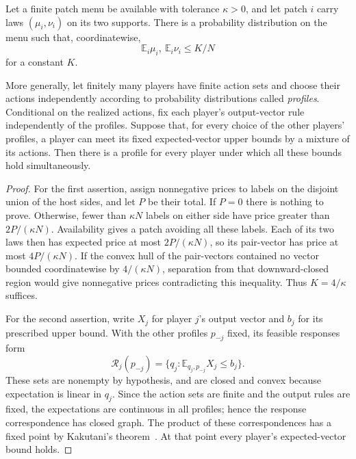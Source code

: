 \begin{lemma}\label{lem:balanced-profiles}
Let a finite patch menu be available with tolerance \(\kappa>0\), and let
patch \(i\) carry laws \((\mu_i,\nu_i)\) on its two supports. There is a
probability distribution on the menu such that, coordinatewise,
\[
 \mathbb E_i\mu_i,\ \mathbb E_i\nu_i\le K/N
\]
for a constant \(K\).

More generally, let finitely many players have finite action sets and
choose their actions independently according to probability distributions
called \emph{profiles}. Conditional on the realized actions, fix each
player's output-vector rule independently of the profiles. Suppose that,
for every choice of the other players' profiles, a player can meet its
fixed expected-vector upper bounds by a mixture of its actions. Then
there is a profile for every player under which all these bounds hold
simultaneously.
\end{lemma}

\begin{proof}
For the first assertion, assign nonnegative prices to labels on the
disjoint union of the host sides, and let \(P\) be their total. If \(P=0\)
there is nothing to prove. Otherwise, fewer than \(\kappa N\) labels on
either side have price greater than \(2P/(\kappa N)\). Availability gives
a patch avoiding all these labels. Each of its two laws then has expected
price at most \(2P/(\kappa N)\), so its pair-vector has price at most
\(4P/(\kappa N)\). If the convex hull of the pair-vectors contained no
vector bounded coordinatewise by \(4/(\kappa N)\), separation from that
downward-closed region would give nonnegative prices contradicting this
inequality. Thus \(K=4/\kappa\) suffices.

For the second assertion, write \(X_j\) for player \(j\)'s output vector
and \(b_j\) for its prescribed upper bound. With the other profiles
\(p_{-j}\) fixed, its feasible responses form
\[
 \mathcal R_j(p_{-j})
   =\{q_j:\mathbb E_{q_j,p_{-j}}X_j\le b_j\}.
\]
These sets are nonempty by hypothesis, and are closed and convex because
expectation is linear in \(q_j\). Since the action sets are finite and the
output rules are fixed, the expectations are continuous in all profiles;
hence the response correspondence has closed graph. The product of these
correspondences has a fixed point by Kakutani's theorem~\cite{kakutani1941}.
At that point every player's expected-vector bound holds.
\end{proof}


